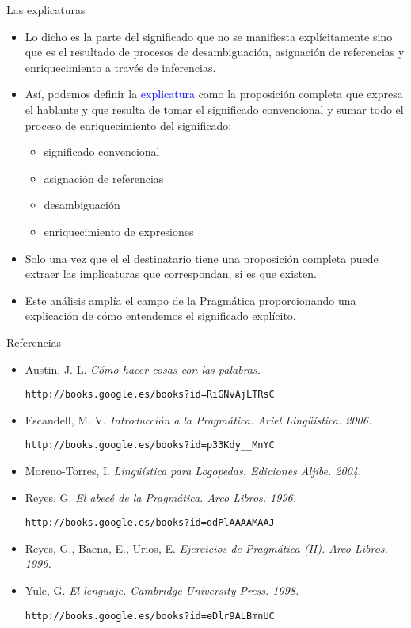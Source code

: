 \documentclass{beamer}
\begin{document}
\begin{frame}{Las explicaturas}

	\begin{itemize}
		\item Lo dicho es la parte del significado que no se manifiesta explícitamente sino que es el resultado de procesos de desambiguación, asignación de referencias y enriquecimiento a través de inferencias. 
		\item Así, podemos definir la \textcolor{blue}{explicatura} como la proposición completa que expresa el hablante y que resulta de tomar el significado convencional y sumar todo el proceso de enriquecimiento del significado: 
		\begin{itemize}
			\item significado convencional
			\item asignación de referencias
			\item desambiguación
			\item enriquecimiento de expresiones
		\end{itemize}
		\item Solo una vez que el el destinatario tiene una proposición completa puede extraer las implicaturas que correspondan, si es que existen.
		\item Este análisis amplía el campo de la Pragmática proporcionando una explicación de cómo entendemos el significado explícito.
	\end{itemize}

\end{frame}



\begin{frame}{Referencias}

\begin{itemize}
	\item Austin, J. L. \it{Cómo hacer cosas con las palabras}.
	\begin{footnotesize}\texttt{http://books.google.es/books?id=RiGNvAjLTRsC}\end{footnotesize}
	\item Escandell, M. V. \it{Introducción a la Pragmática}. Ariel Lingüística. 2006.
	\begin{footnotesize}\texttt{http://books.google.es/books?id=p33Kdy\_\_MnYC}\end{footnotesize}
	\item Moreno-Torres, I. \it{Lingüística para Logopedas}. Ediciones Aljibe. 2004.
	\item Reyes, G. \it{El abecé de la Pragmática}. Arco Libros. 1996.
	\begin{footnotesize}\texttt{http://books.google.es/books?id=ddPlAAAAMAAJ}\end{footnotesize}
	\item Reyes, G., Baena, E., Urios, E. \it{Ejercicios de Pragmática (II)}. Arco Libros. 1996.
	\item Yule, G. \it{El lenguaje}. Cambridge University Press. 1998.
	\begin{footnotesize}\texttt{http://books.google.es/books?id=eDlr9ALBmnUC}\end{footnotesize}
\end{itemize}

\end{frame}
\end{document}
